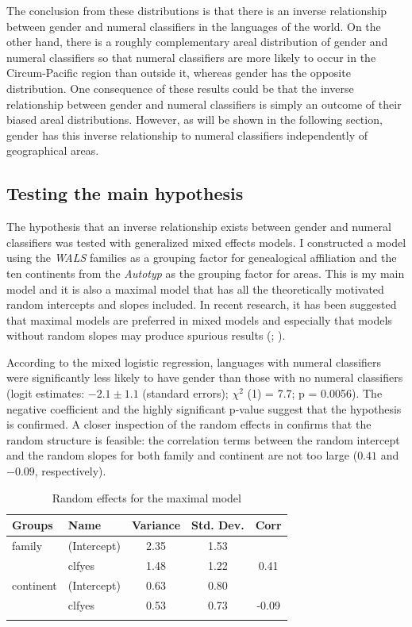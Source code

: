 \documentclass[output=collectionpaper]{langsci/langscibook}
\begin{document}
The conclusion from these distributions is that there is an inverse relationship between gender and numeral classifiers in the languages of the world. On the other hand, there is a roughly complementary areal distribution of gender and numeral classifiers so that numeral classifiers are more likely to occur in the Circum-Pacific region than outside it, whereas gender has the opposite distribution. One consequence of these results could be that the inverse relationship between gender and numeral classifiers is simply an outcome of their biased areal distributions. However, as will be shown in the following section, gender has this inverse relationship to numeral classifiers independently of geographical areas.


\subsection{Testing the main hypothesis}
\label{sec:Sinne:4.2}

The hypothesis that an inverse relationship exists between gender and numeral classifiers was tested with generalized mixed effects models. I constructed a model using the \textit{WALS} families as a grouping factor for genealogical affiliation and the ten continents from the \textit{Autotyp} as the grouping factor for areas. This is my main model and it is also a maximal model that has all the theoretically motivated random intercepts and slopes included. In recent research, it has been suggested that maximal models are preferred in mixed models and especially that models without random slopes may produce spurious results (\citealt{Schielzeth2009}; \citealt{Barr2013}).

According to the mixed logistic regression, languages with numeral classifiers were significantly less likely to have gender than those with no numeral classifiers (logit estimates: $-2.1 \pm 1.1$ (standard errors); $\chi^2$ (1) = 7.7; p = 0.0056). The negative coefficient and the highly significant p-value suggest that the hypothesis is confirmed. A closer inspection of the random effects in  confirms that the random structure is feasible: the correlation terms between the random intercept and the random slopes for both family and continent are not too large ($0.41$ and $-0.09$, respectively).

\begin{table}[htb]
\begin{tabularx}{\textwidth}{XX *{3}{S[table-format=+1.2]}}
\lsptoprule
 Groups &  Name &  {Variance} &  {Std. Dev.} &  {Corr}\\
\midrule
family    & (Intercept) & 2.35 & 1.53\\
          & clfyes      & 1.48 & 1.22 & 0.41\\
continent & (Intercept) & 0.63 & 0.80\\
          & clfyes      & 0.53 & 0.73 & -0.09\\
\lspbottomrule
\end{tabularx}
\caption{Random effects for the maximal model}
\label{tab:Sinne:3}
\end{table}
\end{document}

